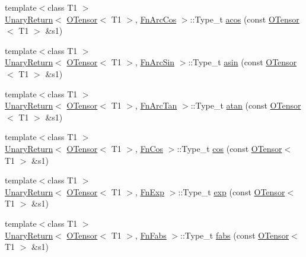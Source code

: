 \begin{DoxyCompactItemize}
{\footnotesize template$<$class T1 $>$ }\\\mbox{\hyperlink{structENSEM_1_1UnaryReturn}{Unary\+Return}}$<$ \mbox{\hyperlink{classENSEM_1_1OTensor}{O\+Tensor}}$<$ T1 $>$, \mbox{\hyperlink{structENSEM_1_1FnArcCos}{Fn\+Arc\+Cos}} $>$\+::Type\+\_\+t \mbox{\hyperlink{group__obstensor_gae3685afbb0e9aa5d37b76c81e344a490}{acos}} (const \mbox{\hyperlink{classENSEM_1_1OTensor}{O\+Tensor}}$<$ T1 $>$ \&s1)
\item 
{\footnotesize template$<$class T1 $>$ }\\\mbox{\hyperlink{structENSEM_1_1UnaryReturn}{Unary\+Return}}$<$ \mbox{\hyperlink{classENSEM_1_1OTensor}{O\+Tensor}}$<$ T1 $>$, \mbox{\hyperlink{structENSEM_1_1FnArcSin}{Fn\+Arc\+Sin}} $>$\+::Type\+\_\+t \mbox{\hyperlink{group__obstensor_gac2f3c33b51a9ad0b1d382eb02ba089df}{asin}} (const \mbox{\hyperlink{classENSEM_1_1OTensor}{O\+Tensor}}$<$ T1 $>$ \&s1)
\item 
{\footnotesize template$<$class T1 $>$ }\\\mbox{\hyperlink{structENSEM_1_1UnaryReturn}{Unary\+Return}}$<$ \mbox{\hyperlink{classENSEM_1_1OTensor}{O\+Tensor}}$<$ T1 $>$, \mbox{\hyperlink{structENSEM_1_1FnArcTan}{Fn\+Arc\+Tan}} $>$\+::Type\+\_\+t \mbox{\hyperlink{group__obstensor_gad2ff83f1912b705b331d775f9c4dfb5a}{atan}} (const \mbox{\hyperlink{classENSEM_1_1OTensor}{O\+Tensor}}$<$ T1 $>$ \&s1)
\item 
{\footnotesize template$<$class T1 $>$ }\\\mbox{\hyperlink{structENSEM_1_1UnaryReturn}{Unary\+Return}}$<$ \mbox{\hyperlink{classENSEM_1_1OTensor}{O\+Tensor}}$<$ T1 $>$, \mbox{\hyperlink{structENSEM_1_1FnCos}{Fn\+Cos}} $>$\+::Type\+\_\+t \mbox{\hyperlink{group__obstensor_gab6c0f7f88211609a81b1ab43c346d285}{cos}} (const \mbox{\hyperlink{classENSEM_1_1OTensor}{O\+Tensor}}$<$ T1 $>$ \&s1)
\item 
{\footnotesize template$<$class T1 $>$ }\\\mbox{\hyperlink{structENSEM_1_1UnaryReturn}{Unary\+Return}}$<$ \mbox{\hyperlink{classENSEM_1_1OTensor}{O\+Tensor}}$<$ T1 $>$, \mbox{\hyperlink{structENSEM_1_1FnExp}{Fn\+Exp}} $>$\+::Type\+\_\+t \mbox{\hyperlink{group__obstensor_ga6403c57fdf642c4972f11c2251aff2ef}{exp}} (const \mbox{\hyperlink{classENSEM_1_1OTensor}{O\+Tensor}}$<$ T1 $>$ \&s1)
\item 
{\footnotesize template$<$class T1 $>$ }\\\mbox{\hyperlink{structENSEM_1_1UnaryReturn}{Unary\+Return}}$<$ \mbox{\hyperlink{classENSEM_1_1OTensor}{O\+Tensor}}$<$ T1 $>$, \mbox{\hyperlink{structENSEM_1_1FnFabs}{Fn\+Fabs}} $>$\+::Type\+\_\+t \mbox{\hyperlink{group__obstensor_ga246cc858f35ed63a911bfa33abd22d98}{fabs}} (const \mbox{\hyperlink{classENSEM_1_1OTensor}{O\+Tensor}}$<$ T1 $>$ \&s1)

\end{DoxyCompactItemize}
